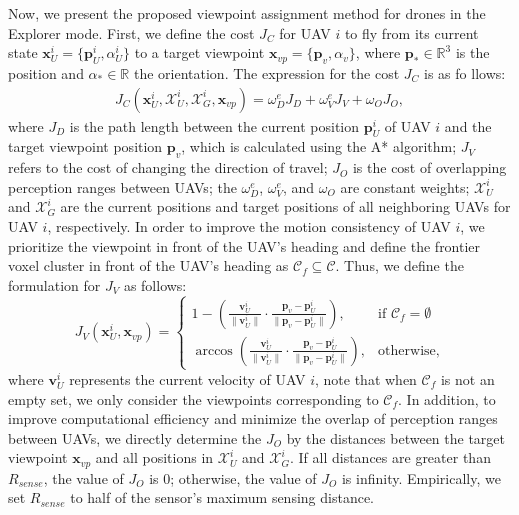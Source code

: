 \documentclass[letterpaper, 10pt, journal, twoside]{support/IEEEtran}
\begin{document}
Now, we present the proposed viewpoint assignment method for drones in the Explorer mode. First, we define the cost \( J_C \) for UAV \( i \) to fly from its current state \( \mathbf{x}_U^i = \{ \mathbf{p}_U^i, \alpha_U^i \} \) to a target viewpoint \( \mathbf{x}_{vp} = \{ \mathbf{p}_v, \alpha_v \} \), where $\mathbf{p}_* \in \mathbb{R}^3$ is the position and $\alpha_* \in \mathbb{R}$ the orientation. The expression for the cost \( J_C \) is as fo
llows:
\begin{equation}
  \label{eq_assign1}
  \begin{aligned}
      J_{C}(\mathbf{x}_U^i, \mathcal{X}_U^i, \mathcal{X}_G^i, \mathbf{x}_{vp}) = \omega_D^e J_D + \omega_V^e J_V + \omega_O J_O,
  \end{aligned}
\end{equation}
where \( J_D \) is the path length between the current position \( \mathbf{p}_U^i \) of UAV \( i \) and the target viewpoint position \( \mathbf{p}_v \), which is calculated using the A* algorithm; \( J_V \) refers to the cost of changing the direction of travel; \( J_O \) is the cost of overlapping perception ranges between UAVs; the \( \omega_D^e \), \( \omega_V^e \), and \( \omega_O \) are constant weights; \( \mathcal{X}_U^i \) and \( \mathcal{X}_G^i \) are the current positions and target positions of all neighboring UAVs for UAV $i$, respectively.
In order to improve the motion consistency of UAV $i$, we prioritize the viewpoint in front of the UAV's heading and define the frontier voxel cluster in front of the UAV's heading as \( \mathcal{C}_f \subseteq \mathcal{C} \). Thus, we define the formulation for \( J_V \) as follows:
\begin{equation}
  \label{eq_assign2}
  J_V(\mathbf{x}_U^i, \mathbf{x}_{vp})=
	\begin{cases} 
		1 - ( 
      \frac{\mathbf{v}_U^i}{\|\mathbf{v}_U^i\|} \cdot
      \frac{\mathbf{p}_{v} - \mathbf{p}_U^i}{\|\mathbf{p}_{v} - \mathbf{p}_U^i\|}
      ), & \text{if } \mathcal{C}_f=\emptyset \\
      \arccos( 
      \frac{\mathbf{v}_U^i}{\|\mathbf{v}_U^i\|} \cdot
      \frac{\mathbf{p}_{v} - \mathbf{p}_U^i}{\|\mathbf{p}_{v} - \mathbf{p}_U^i\|}
      ), & \text{otherwise},
	\end{cases}
\end{equation}
where \(\mathbf{v}_U^i\) represents the current velocity of UAV \(i\), note that when \(\mathcal{C}_f\) is not an empty set, we only consider the viewpoints corresponding to \(\mathcal{C}_f\). 
In addition, to improve computational efficiency and minimize the overlap of perception ranges between UAVs, we directly determine the \(J_O\) by the distances between the target viewpoint \(\mathbf{x}_{vp}\) and all positions in \(\mathcal{X}_U^i\) and \(\mathcal{X}_G^i\). If all distances are greater than $R_{sense}$, the value of \(J_O\) is 0; otherwise, the value of \(J_O\) is infinity. Empirically, we set $R_{sense}$ to half of the sensor's maximum sensing distance.
\end{document}
